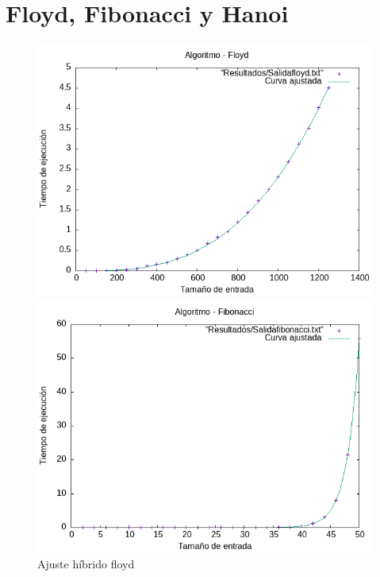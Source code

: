 \documentclass[11pt,openany]{book}
\begin{document}
\section*{Floyd, Fibonacci y Hanoi}
\begin{figure}[H]
    \begin{minipage}{0.5\textwidth}
        \centering
        \includegraphics[width=\linewidth]{assets/AjusteHibrido_latex/Hibrido_fibonacci_floyd_hanoi/Floyd_hib.png}
        \caption{Ajuste híbrido floyd}
        \label{fig:floyd}
    \end{minipage}%
    \begin{minipage}{0.5\textwidth}
        \centering
        \includegraphics[width=\linewidth]{assets/AjusteHibrido_latex/Hibrido_fibonacci_floyd_hanoi/Fibonacci_hib.png}

\end{minipage}
\end{figure}
\end{document}
